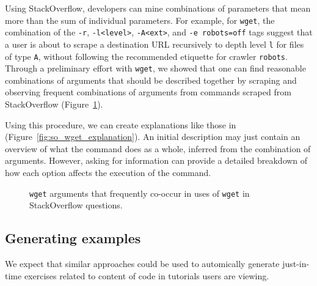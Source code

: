 Using StackOverflow, developers can mine combinations of parameters that mean more than the sum of individual parameters.
For example, for \texttt{wget}, the combination of the \texttt{-r}, \texttt{-l<level>}, \texttt{-A<ext>}, and \texttt{-e robots=off} tags suggest that a user is about to scrape a destination URL recursively to depth level \texttt{l} for files of type \texttt{A}, without following the recommended etiquette for crawler \texttt{robots}.
Through a preliminary effort with \texttt{wget}, we showed that one can find reasonable combinations of arguments that should be described together by scraping and observing frequent combinations of arguments from commands scraped from StackOverflow (Figure~\ref{fig:wget_arguments}).

Using this procedure, we can create explanations like those in (Figure~\ref{fig:so_wget_explanation}).
An initial description may just contain an overview of what the command does as a whole, inferred from the combination of arguments.
However, asking for information can provide a detailed breakdown of how each option affects the execution of the command.

\begin{figure}
\caption{\texttt{wget} arguments that frequently co-occur in uses of \texttt{wget} in StackOverflow questions. }
\label{fig:wget_arguments}
\end{figure}

\subsection{Generating examples}

We expect that similar approaches could be used to automically generate just-in-time exercises related to content of code in tutorials users are viewing. 

